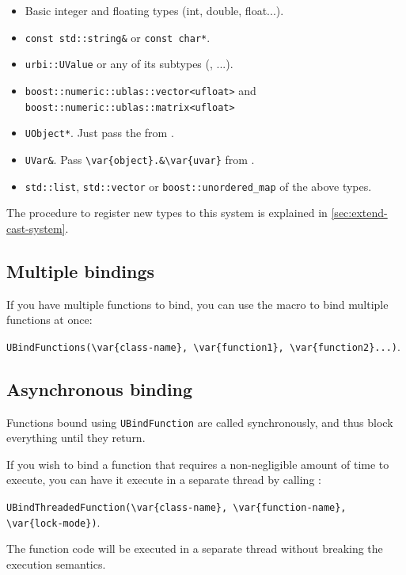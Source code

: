 \begin{itemize}
\item Basic integer and floating types (int, double, float...).
\item \lstinline{const std::string&} or \lstinline{const char*}.
\item \lstinline{urbi::UValue} or any of its subtypes (\UBinary, \UList...).
\item \lstinline{boost::numeric::ublas::vector<ufloat>} and
\lstinline{boost::numeric::ublas::matrix<ufloat>}
\item \lstinline{UObject*}. Just pass the \UObject from \us.
\item \lstinline{UVar&}. Pass \lstinline|\var{object}.&\var{uvar}| from \us.
\item \lstinline{std::list}, \lstinline{std::vector} or
\lstinline{boost::unordered_map} of the above types.
\end{itemize}

The procedure to register new types to this system is explained in
\autoref{sec:extend-cast-system}.

\subsection{Multiple bindings}
If you have multiple functions to bind, you can use the
 macro to bind multiple functions at once:

\lstinline|UBindFunctions(\var{class-name}, \var{function1}, \var{function2}...)|.

\subsection{Asynchronous binding}
\label{sec:uobject:asynchronous-binding}
Functions bound using \lstinline{UBindFunction} are called synchronously, and
thus block everything until they return.

If you wish to bind a function that requires a non-negligible amount of time
to execute, you can have it execute in a separate thread by calling
:

\lstinline|UBindThreadedFunction(\var{class-name}, \var{function-name}, \var{lock-mode})|.

The function code will be executed in a separate thread without breaking the
\us execution semantics.

